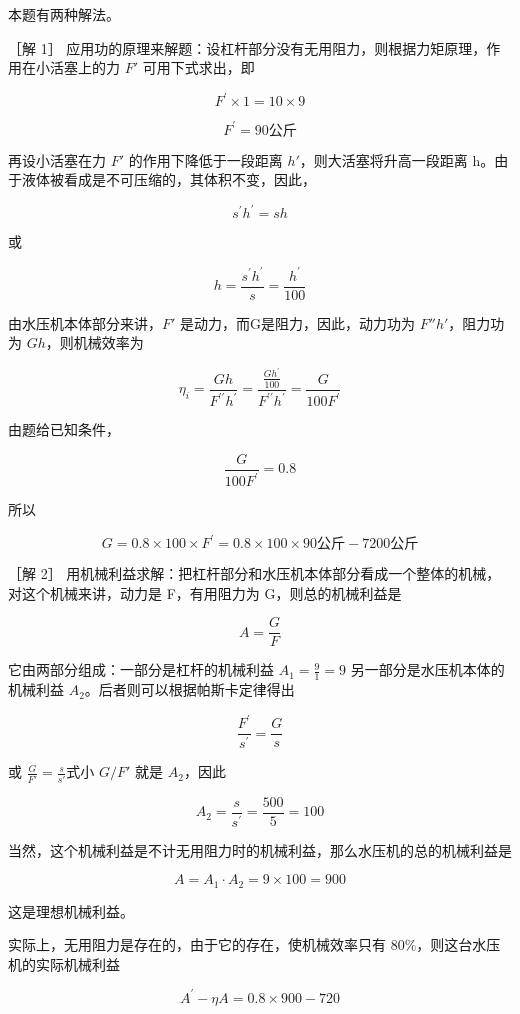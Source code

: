 本题有两种解法。

［解 1］
应用功的原理来解题：设杠杆部分没有无用阻力，则根据力矩原理，作用在小活塞上的力
\(F'\) 可用下式求出，即

\[
F ^ {\prime} \times 1 = 10 \times 9
\]

\[
F ^ {\prime} = 90 \text{公斤}
\]

再设小活塞在力 \(F'\) 的作用下降低于一段距离
\(h'\)，则大活塞将升高一段距离
h。由于液体被看成是不可压缩的，其体积不变，因此，

\[
s ^ {\prime} h ^ {\prime} = s h
\]

或

\[
h = \frac {s ^ {\prime} h ^ {\prime}}{s} = \frac {h ^ {\prime}}{100}
\]

由水压机本体部分来讲，\(F'\) 是动力，而G是阻力，因此，动力功为
\(F''h'\)，阻力功为 \(Gh\)，则机械效率为

\[
\eta_ {i} = \frac {G h}{F ^ {\prime \prime} h ^ {\prime}} = \frac {\frac {G h ^ {\prime}}{100}}{F ^ {\prime \prime} h ^ {\prime}} = \frac {G}{100 F ^ {\prime}}
\]

由题给已知条件，

\[
\frac {G}{100 F ^ {\prime}} = 0.8
\]

所以

\[
G = 0.8 \times 100 \times F ^ {\prime} = 0.8 \times 100 \times 90 \text{公斤} - 7200 \text{公斤}
\]

［解 2］
用机械利益求解：把杠杆部分和水压机本体部分看成一个整体的机械，对这个机械来讲，动力是
F，有用阻力为 G，则总的机械利益是

\[
A = \frac {G}{F}
\]

它由两部分组成：一部分是杠杆的机械利益 \(A_{1} = \frac{9}{1} = 9\)
另一部分是水压机本体的机械利益 \(A_{2}\)。后者则可以根据帕斯卡定律得出

\[
\frac {F ^ {\prime}}{s ^ {\prime}} = \frac {G}{s}
\]

或 \(\frac{G}{F'} = \frac{s}{s'}\)式小 \(G / F'\) 就是 \(A_{2}\)，因此

\[
A _ {2} = \frac {s}{s ^ {\prime}} = \frac {500}{5} = 100
\]

当然，这个机械利益是不计无用阻力时的机械利益，那么水压机的总的机械利益是

\[
A = A _ {1} \cdot A _ {2} = 9 \times 100 = 900
\]

这是理想机械利益。

实际上，无用阻力是存在的，由于它的存在，使机械效率只有
\(80\%\)，则这台水压机的实际机械利益

\[
A ^ {\prime} - \eta A = 0.8 \times 900 - 720
\]

